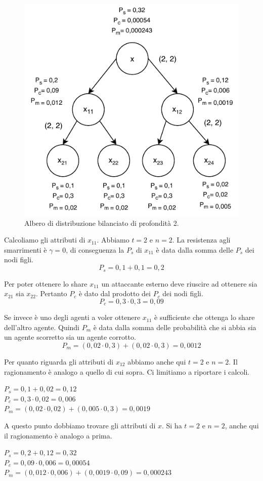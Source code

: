 \begin{figure}[H]
	\centering
	\includegraphics[width=0.6\linewidth]{images/chap_analisi_robustezza/robustezza-2-1.pdf}
	\caption{Albero di distribuzione bilanciato di profondità 2.}
	\label{fig:robustezza-2-1}
\end{figure}

Calcoliamo gli attributi di $ x_{11} $. Abbiamo $ t = 2 $ e $ n = 2 $.
La resistenza agli smarrimenti è $ \gamma = 0 $,
di conseguenza la $ P_s $ di $ x_{11} $ è data dalla somma delle $ P_s $ dei nodi figli.
$$ P_s = 0,1 + 0,1 = 0,2 $$

Per poter ottenere lo share $ x_{11} $ un attaccante esterno deve riuscire ad ottenere
sia $ x_{21} $ sia $ x_{22} $. Pertanto $ P_c $ è dato dal prodotto dei $ P_c $ dei nodi figli.
$$ P_c = 0,3 \cdot 0,3 = 0,09 $$

Se invece è uno degli agenti a voler ottenere $ x_{11} $ è sufficiente che ottenga
lo share dell'altro agente. Quindi $ P_m $ è data dalla somma delle probabilità
che si abbia sia un agente scorretto sia un agente corrotto.
$$ P_m = (0,02 \cdot 0,3) + (0,02 \cdot 0,3) = 0,0012 $$

Per quanto riguarda gli attributi di $ x_{12} $ abbiamo anche qui $ t = 2 $ e $ n = 2 $.
Il ragionamento è analogo a quello di cui sopra. Ci limitiamo
a riportare i calcoli.
\begin{tightcenter}
	$ P_s = 0,1 + 0,02 = 0,12 $      \\
	$ P_c = 0,3 \cdot 0,02 = 0,006 $ \\
	$ P_m = (0,02 \cdot 0,02) + (0,005 \cdot 0,3) = 0,0019 $
\end{tightcenter}
A questo punto dobbiamo trovare gli attributi di $ x $.
Si ha $ t = 2 $ e $ n = 2 $, anche qui il ragionamento è analogo a prima.
\begin{tightcenter}
	$ P_s = 0,2 + 0,12 = 0,32 $\\
	$ P_c = 0,09 \cdot 0,006 = 0,00054 $\\
	$ P_m = (0,012 \cdot 0,006) + (0,0019 \cdot 0,09) = 0,000243 $
\end{tightcenter}

